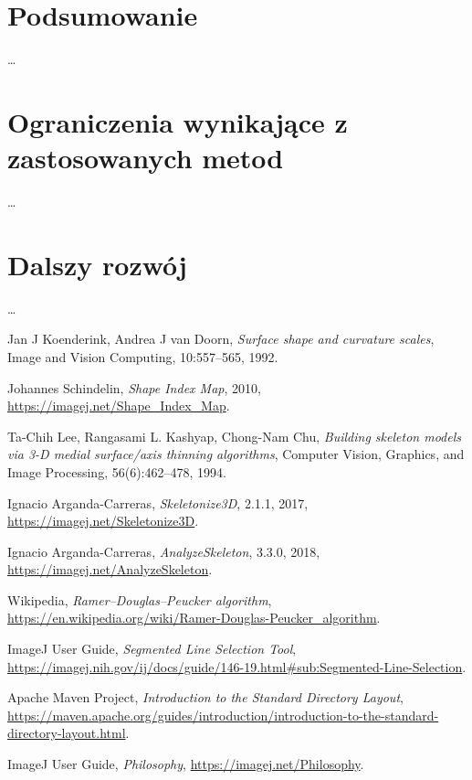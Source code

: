 \documentclass[declaration,shortabstract,mgr]{iithesis}
\begin{document}
\section{Podsumowanie}
\ldots %
\section{Ograniczenia wynikające z zastosowanych metod}
\ldots %
\section{Dalszy rozwój}
\ldots %







\begin{thebibliography}{1}

  Jan J Koenderink, Andrea J van Doorn,
  \emph{Surface shape and curvature scales},
  Image and Vision Computing,
  10:557--565,
  1992.

  Johannes Schindelin,
  \emph{Shape Index Map},
  2010,
  \url{https://imagej.net/Shape_Index_Map}.

  Ta-Chih Lee, Rangasami L. Kashyap, Chong-Nam Chu,
  \emph{Building skeleton models via 3-D medial surface/axis thinning algorithms},
  Computer Vision, Graphics, and Image Processing,
  56(6):462--478,
  1994.

  Ignacio Arganda-Carreras,
  \emph{Skeletonize3D},
  2.1.1,
  2017,
  \url{https://imagej.net/Skeletonize3D}.

  Ignacio Arganda-Carreras,
  \emph{AnalyzeSkeleton},
  3.3.0,
  2018,
  \url{https://imagej.net/AnalyzeSkeleton}.
  
  Wikipedia,
  \emph{Ramer--Douglas--Peucker algorithm},
  \url{https://en.wikipedia.org/wiki/Ramer-Douglas-Peucker_algorithm}.
  
  ImageJ User Guide,
  \emph{Segmented Line Selection Tool},
  \url{https://imagej.nih.gov/ij/docs/guide/146-19.html#sub:Segmented-Line-Selection}.
  
  Apache Maven Project,
  \emph{Introduction to the Standard Directory Layout},
  \url{https://maven.apache.org/guides/introduction/introduction-to-the-standard-directory-layout.html}.

  ImageJ User Guide,
  \emph{Philosophy},
  \url{https://imagej.net/Philosophy}.

\end{thebibliography}
\end{document}
